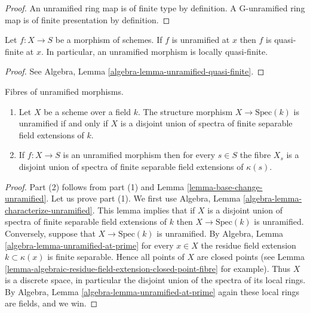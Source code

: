 \begin{proof}
An unramified ring map is of finite type by definition.
A G-unramified ring map is of finite presentation by definition.
\end{proof}

\begin{lemma}
\label{lemma-unramified-quasi-finite}
Let $f : X \to S$ be a morphism of schemes.
If $f$ is unramified at $x$ then $f$ is quasi-finite at $x$.
In particular, an unramified morphism is locally quasi-finite.
\end{lemma}

\begin{proof}
See Algebra, Lemma \ref{algebra-lemma-unramified-quasi-finite}.
\end{proof}

\begin{lemma}
\label{lemma-unramified-over-field}
Fibres of unramified morphisms.
\begin{enumerate}
\item Let $X$ be a scheme over a field $k$.
The structure morphism $X \to \text{Spec}(k)$ is unramified if
and only if $X$ is a disjoint union of spectra of finite separable
field extensions of $k$.
\item If $f : X \to S$ is an unramified morphism then for every $s \in S$
the fibre $X_s$ is a disjoint union of spectra of finite separable field
extensions of $\kappa(s)$.
\end{enumerate}
\end{lemma}

\begin{proof}
Part (2) follows from part (1) and
Lemma \ref{lemma-base-change-unramified}.
Let us prove part (1).
We first use Algebra, Lemma \ref{algebra-lemma-characterize-unramified}.
This lemma implies that if $X$ is a disjoint union of spectra of finite
separable field extensions of $k$ then $X \to \text{Spec}(k)$ is unramified.
Conversely, suppose that $X \to \text{Spec}(k)$ is unramified.
By Algebra, Lemma \ref{algebra-lemma-unramified-at-prime} for every $x \in X$
the residue field extension $k \subset \kappa(x)$ is
finite separable. Hence all points of $X$ are closed points (see
Lemma \ref{lemma-algebraic-residue-field-extension-closed-point-fibre}
for example). Thus $X$ is a discrete space, in particular the disjoint union
of the spectra of its local rings. By
Algebra, Lemma \ref{algebra-lemma-unramified-at-prime} again these
local rings are fields, and we win.
\end{proof}

